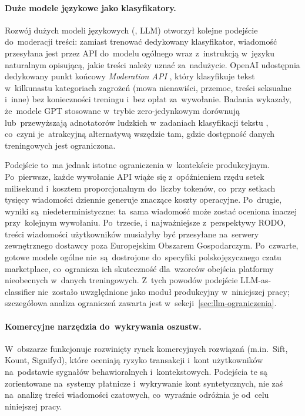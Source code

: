 \paragraph{Duże modele językowe jako klasyfikatory.}
Rozwój dużych modeli językowych (, LLM) otworzył
kolejne podejście do~moderacji treści: zamiast trenować dedykowany klasyfikator,
wiadomość przesyłana jest przez API do~modelu ogólnego wraz z~instrukcją w~języku
naturalnym opisującą, jakie treści należy uznać za~nadużycie.
OpenAI udostępnia dedykowany punkt końcowy \textit{Moderation API}
\cite{bib:openai-moderation}, który klasyfikuje tekst w~kilkunastu kategoriach
zagrożeń (mowa nienawiści, przemoc, treści seksualne i~inne) bez konieczności
treningu i~bez opłat za~wywołanie.
Badania wykazały, że~modele GPT stosowane w~trybie zero-jedynkowym dorównują
lub~przewyższają adnotatorów ludzkich w~zadaniach klasyfikacji tekstu
\cite{bib:gilardi2023}, co~czyni je~atrakcyjną alternatywą wszędzie tam,
gdzie dostępność danych treningowych jest ograniczona.

Podejście to~ma jednak istotne ograniczenia w~kontekście produkcyjnym.
Po~pierwsze, każde wywołanie API wiąże się z~opóźnieniem rzędu setek
milisekund i~kosztem proporcjonalnym do~liczby tokenów, co~przy setkach
tysięcy wiadomości dziennie generuje znaczące koszty operacyjne.
Po~drugie, wyniki są~niedeterministyczne: ta~sama wiadomość może zostać
oceniona inaczej przy~kolejnym wywołaniu. Po~trzecie, i~najważniejsze
z~perspektywy RODO, treści wiadomości użytkowników musiałyby być przesyłane
na~serwery zewnętrznego dostawcy poza Europejskim Obszarem Gospodarczym.
Po~czwarte, gotowe modele ogólne nie~są~dostrojone do~specyfiki
polskojęzycznego czatu marketplace, co~ogranicza ich skuteczność
dla~wzorców obejścia platformy nieobecnych w~danych treningowych.
Z~tych powodów podejście LLM-as-classifier nie~zostało uwzględnione
jako moduł produkcyjny w~niniejszej pracy; szczegółowa analiza ograniczeń
zawarta jest w~sekcji~\ref{sec:llm-ograniczenia}.

\paragraph{Komercyjne narzędzia do~wykrywania oszustw.}
W~obszarze  funkcjonuje rozwinięty rynek komercyjnych
rozwiązań (m.in.\ Sift, Kount, Signifyd), które oceniają ryzyko transakcji
i~kont użytkowników na~podstawie sygnałów behawioralnych i~kontekstowych.
Podejścia te są zorientowane na~systemy płatnicze i~wykrywanie kont syntetycznych,
nie zaś na~analizę treści wiadomości czatowych, co~wyraźnie odróżnia je
od~celu niniejszej pracy.


